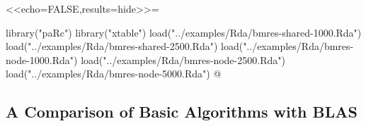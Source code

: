 <<echo=FALSE,results=hide>>=

library("paRc")
library("xtable")
load("../examples/Rda/bmres-shared-1000.Rda")
load("../examples/Rda/bmres-shared-2500.Rda")
load("../examples/Rda/bmres-node-1000.Rda")
load("../examples/Rda/bmres-node-2500.Rda")
load("../examples/Rda/bmres-node-5000.Rda")
@ 


\subsection{A Comparison of Basic Algorithms with BLAS}

